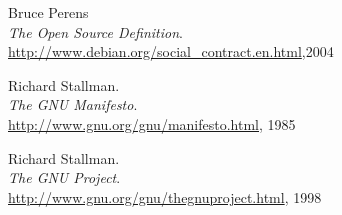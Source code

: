 \begin{thebibliography}{}
	 Bruce Perens\\
		\emph{The Open Source Definition}.\\
		\url{http://www.debian.org/social\_contract.en.html},2004
	
	 Richard Stallman.\\
		\emph{The GNU Manifesto}.\\
		\url{http://www.gnu.org/gnu/manifesto.html}, 1985
	
	 Richard Stallman.\\
		\emph{The GNU Project}.\\
		\url{http://www.gnu.org/gnu/thegnuproject.html}, 1998
\end{thebibliography}
